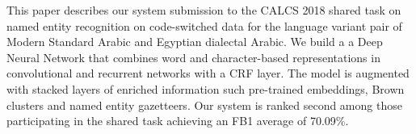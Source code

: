 This paper describes our system submission to the CALCS 2018 shared task on named entity recognition on code-switched data for the language variant pair of Modern Standard Arabic and Egyptian dialectal Arabic. We build a a Deep Neural Network that combines word and character-based representations in convolutional and recurrent networks with a CRF layer. The model is augmented with stacked layers of enriched information such pre-trained embeddings, Brown clusters and named entity gazetteers. Our system is ranked second among those participating in the shared task achieving an FB1 average of 70.09\%.
